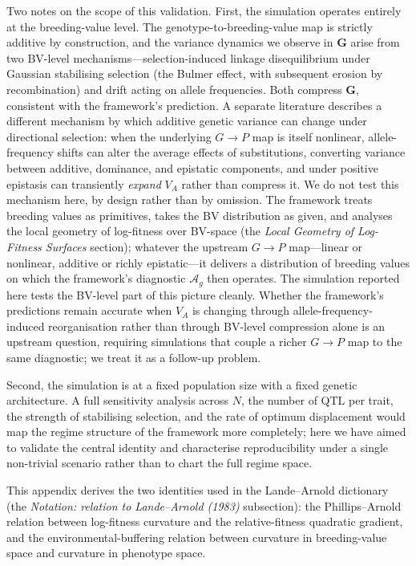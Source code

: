 \documentclass[9pt,twocolumn,twoside,lineno]{gsajnl}
\newcommand{\mat}[1]{\mathbf{#1}}
\newcommand{\Ag}{\ensuremath{\mathcal{A}_{g}}\xspace}
\begin{document}
Two notes on the scope of this validation. First, the simulation operates entirely at the breeding-value level. The genotype-to-breeding-value map is strictly additive by construction, and the variance dynamics we observe in $\mat{G}$ arise from two BV-level mechanisms---selection-induced linkage disequilibrium under Gaussian stabilising selection (the Bulmer effect, with subsequent erosion by recombination) and drift acting on allele frequencies. Both compress $\mat{G}$, consistent with the framework's prediction. A separate literature \citep{CheverudRoutman1995,Hansen2006,Hansen2013,CarterHermissonHansen2005} describes a different mechanism by which additive genetic variance can change under directional selection: when the underlying $G\!\to\!P$ map is itself nonlinear, allele-frequency shifts can alter the average effects of substitutions, converting variance between additive, dominance, and epistatic components, and under positive epistasis can transiently \emph{expand} $V_A$ rather than compress it. We do not test this mechanism here, by design rather than by omission. The framework treats breeding values as primitives, takes the BV distribution as given, and analyses the local geometry of log-fitness over BV-space (the \textit{Local Geometry of Log-Fitness Surfaces} section); whatever the upstream $G\!\to\!P$ map---linear or nonlinear, additive or richly epistatic---it delivers a distribution of breeding values on which the framework's diagnostic $\Ag$ then operates. The simulation reported here tests the BV-level part of this picture cleanly. Whether the framework's predictions remain accurate when $V_A$ is changing through allele-frequency-induced reorganisation rather than through BV-level compression alone is an upstream question, requiring simulations that couple a richer $G\!\to\!P$ map to the same diagnostic; we treat it as a follow-up problem.

Second, the simulation is at a fixed population size with a fixed genetic architecture. A full sensitivity analysis across $N$, the number of QTL per trait, the strength of stabilising selection, and the rate of optimum displacement would map the regime structure of the framework more completely; here we have aimed to validate the central identity and characterise reproducibility under a single non-trivial scenario rather than to chart the full regime space.

This appendix derives the two identities used in the Lande--Arnold dictionary (the \textit{Notation: relation to Lande--Arnold (1983)} subsection): the Phillips--Arnold relation between log-fitness curvature and the relative-fitness quadratic gradient, and the environmental-buffering relation between curvature in breeding-value space and curvature in phenotype space.
\end{document}
